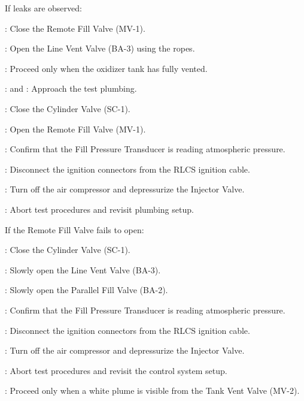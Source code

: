 \begin{checklist}
\begin{checklist}[label=$\bullet$]
    		\item If leaks are observed:
    		\begin{checklist}
    			\item \control{}: Close the Remote Fill Valve (MV-1). 
    			\item \primary{}: Open the Line Vent Valve (BA-3) using the ropes. 
    			\item \ops{}: Proceed only when the oxidizer tank has fully vented. 
    			\item \primary{}: and \secondary{}: Approach the test plumbing.
    			\item \primary{}: Close the Cylinder Valve (SC-1). 
    			\item \control{}: Open the Remote Fill Valve (MV-1). 
    			\item \daq{}: Confirm that the Fill Pressure Transducer is reading atmospheric pressure. 
    			\item \secondary{}: Disconnect the ignition connectors from the RLCS ignition cable. 
    			\item \primary{}: Turn off the air compressor and depressurize the Injector Valve. 
    			\item \ops{}: Abort test procedures and revisit plumbing setup.
    		\end{checklist}
    		\item If the Remote Fill Valve fails to open:
    		\begin{checklist}
    			\item \primary{}: Close the Cylinder Valve (SC-1). 
    			\item \primary{}: Slowly open the Line Vent Valve (BA-3). 
    			\item \primary{}: Slowly open the Parallel Fill Valve (BA-2).
    			\item \daq{}: Confirm that the Fill Pressure Transducer is reading atmospheric pressure. 
    			\item \secondary{}: Disconnect the ignition connectors from the RLCS ignition cable. 
    			\item \primary{}: Turn off the air compressor and depressurize the Injector Valve. 
    			\item \ops{}: Abort test procedures and revisit the control system setup. 
    		\end{checklist}
    	\end{checklist}
    	\item \ops{}: Proceed only when a white plume is visible from the Tank Vent Valve (MV-2). 

\end{checklist}
